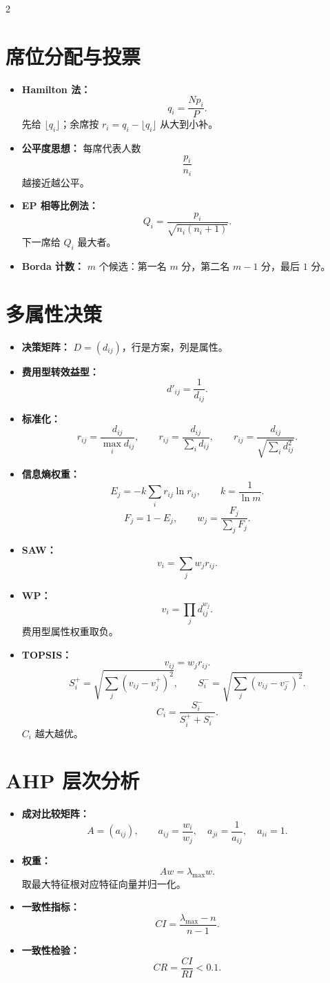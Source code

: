\documentclass[UTF8,fontset=windows,10pt,a4paper]{ctexart}
\newcommand{\tagline}[1]{\textbf{\color{blue!60!black}#1：}}
\begin{document}
\begin{multicols}{2}
\section{席位分配与投票}
\begin{itemize}
  \item \tagline{Hamilton 法}
  \[
    q_i=\frac{Np_i}{P}.
  \]
  先给 $\lfloor q_i\rfloor$；余席按 $r_i=q_i-\lfloor q_i\rfloor$ 从大到小补。
  \item \tagline{公平度思想} 每席代表人数
  \[
    \frac{p_i}{n_i}
  \]
  越接近越公平。
  \item \tagline{EP 相等比例法}
  \[
    Q_i=\frac{p_i}{\sqrt{n_i(n_i+1)}}.
  \]
  下一席给 $Q_i$ 最大者。
  \item \tagline{Borda 计数} $m$ 个候选：第一名 $m$ 分，第二名 $m-1$ 分，最后 $1$ 分。
\end{itemize}

\section{多属性决策}
\begin{itemize}
  \item \tagline{决策矩阵} $D=(d_{ij})$，行是方案，列是属性。
  \item \tagline{费用型转效益型}
  \[
    d'_{ij}=\frac1{d_{ij}}.
  \]
  \item \tagline{标准化}
  \[
    r_{ij}=\frac{d_{ij}}{\max_i d_{ij}},\qquad
    r_{ij}=\frac{d_{ij}}{\sum_i d_{ij}},\qquad
    r_{ij}=\frac{d_{ij}}{\sqrt{\sum_i d_{ij}^2}}.
  \]
  \item \tagline{信息熵权重}
  \[
    E_j=-k\sum_i r_{ij}\ln r_{ij},\qquad k=\frac1{\ln m}.
  \]
  \[
    F_j=1-E_j,\qquad w_j=\frac{F_j}{\sum_jF_j}.
  \]
  \item \tagline{SAW}
  \[
    v_i=\sum_j w_jr_{ij}.
  \]
  \item \tagline{WP}
  \[
    v_i=\prod_j d_{ij}^{w_j}.
  \]
  费用型属性权重取负。
  \item \tagline{TOPSIS}
  \[
    v_{ij}=w_jr_{ij}.
  \]
  \[
    S_i^+=\sqrt{\sum_j(v_{ij}-v_j^+)^2},\qquad
    S_i^-=\sqrt{\sum_j(v_{ij}-v_j^-)^2}.
  \]
  \[
    C_i=\frac{S_i^-}{S_i^+ + S_i^-}.
  \]
  $C_i$ 越大越优。
\end{itemize}

\section{AHP 层次分析}
\begin{itemize}
  \item \tagline{成对比较矩阵}
  \[
    A=(a_{ij}),\qquad a_{ij}=\frac{w_i}{w_j},\quad
    a_{ji}=\frac1{a_{ij}},\quad a_{ii}=1.
  \]
  \item \tagline{权重}
  \[
    Aw=\lambda_{\max}w.
  \]
  取最大特征根对应特征向量并归一化。
  \item \tagline{一致性指标}
  \[
    CI=\frac{\lambda_{\max}-n}{n-1}.
  \]
  \item \tagline{一致性检验}
  \[
    CR=\frac{CI}{RI}<0.1.
  \]
\end{itemize}


\end{multicols}
\end{document}
